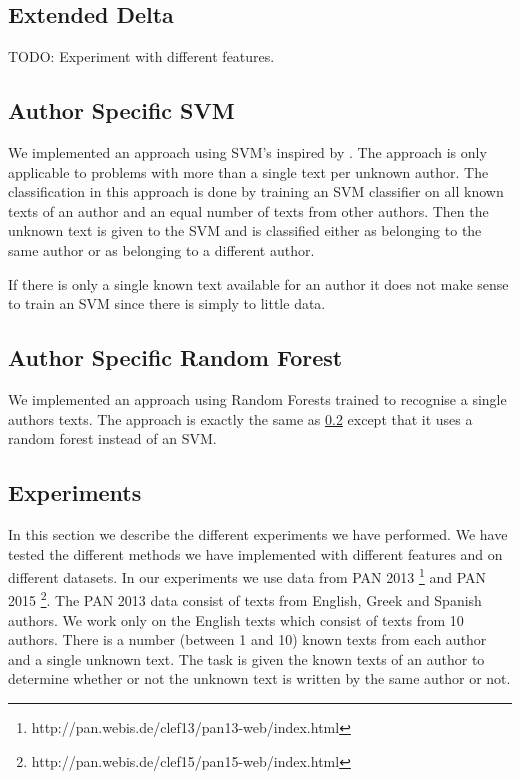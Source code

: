 \subsection{Extended Delta}
TODO: Experiment with different features.

\subsection{Author Specific SVM} \label{subsec:author_specific_svm}
We implemented an approach using \gls{SVM}'s inspired by \cite{hansen2014}. The
approach is only applicable to problems with more than a single text per
unknown author. The classification in this approach is done by training an \gls{SVM}
classifier on all known texts of an author and an equal number of texts from
other authors. Then the unknown text is given to the \gls{SVM} and is classified
either as belonging to the same author or as belonging to a different author.

If there is only a single known text available for an author it does not make
sense to train an \gls{SVM} since there is simply to little data.

\subsection{Author Specific Random Forest}
We implemented an approach using Random Forests trained to recognise a single
authors texts. The approach is exactly the same as
\ref{subsec:author_specific_svm} except that it uses a random forest instead of
an \gls{SVM}.

\subsection{Experiments}
In this section we describe the different experiments we have performed.
We have tested the different methods we have implemented with different
features and on different datasets. In our experiments we use data from PAN
2013 \footnote{http://pan.webis.de/clef13/pan13-web/index.html} and PAN 2015
\footnote{http://pan.webis.de/clef15/pan15-web/index.html}. The PAN 2013 data
consist of texts from English, Greek and Spanish authors. We work only on the
English texts which consist of texts from 10 authors. There is a number (between
1 and 10) known texts from each author and a single unknown text. The task is
given the known texts of an author to determine whether or not the unknown text
is written by the same author or not.

